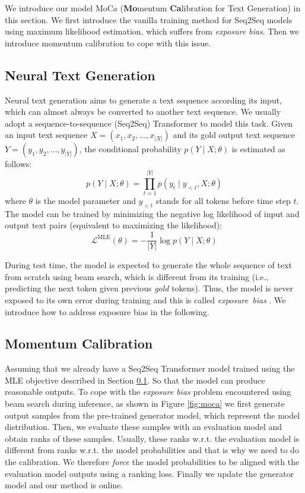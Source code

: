\documentclass{article}
\begin{document}
We introduce our model MoCa ({\bf Mo}mentum {\bf Ca}libration for Text Generation) in this section. We first introduce the vanilla training method for Seq2Seq models using maximum likelihood estimation, which suffers from \emph{exposure bias}. Then we introduce momentum calibration to cope with  this issue.

\subsection{Neural Text Generation}
\label{sec:generation}
Neural text generation aims to generate a text sequence according its input, which can almost always be converted to another text sequence. We usually adopt a sequence-to-sequence (Seq2Seq) Transformer \cite{Vaswani:2017:NIPS} to model this task. Given an input text sequence $X=( x_1, x_2, \ldots, x_{|X|} )$ and its gold output text sequence $Y= (y_1, y_2, \ldots, y_{|Y|} )$, the conditional probability $p(Y \mid X ; \theta)$ is estimated as follows:
\begin{equation}
    \label{eq:model_prob}
    p(Y \mid X ; \theta)=\prod_{t=1}^{|Y|} p\left(y_t \mid y_{<t}, X ; \theta\right)
\end{equation}
where $\theta$ is the model parameter and $y_{<t}$ stands for all tokens before time step $t$.
The model can be trained by minimizing the negative log likelihood of input and output text pairs (equivalent to maximizing the likelihood):
\begin{equation}
    \label{eq:nll_loss}
    \mathcal{L}^{\text{MLE}}(\theta)=-\frac{1}{|Y|} \log p(Y \mid X ; \theta)
\end{equation}

During test time, the model is expected to generate the whole sequence of text from scratch using beam search, which is different from its training (i.e., predicting the next token given previous \emph{gold} tokens). Thus, the model is never exposed to its own error during training and this is called 
\mbox{\emph{exposure bias}} \cite{ranzato:2015:arxiv}. We introduce how to address exposure bias in the following.


\subsection{Momentum Calibration}
Assuming that we already have a Seq2Seq Transformer model trained using the MLE objective described in Section \ref{sec:generation}. So that the model can produce reasonable outputs. To cope with the \emph{exposure bias} problem encountered using beam search during inference, as shown in Figure \ref{fig:moca} we first generate output samples from the pre-trained generator model, which represent the model distribution. Then, we evaluate these samples with an evaluation model and obtain ranks of these samples. Usually, these ranks w.r.t. the evaluation model is different from ranks w.r.t. the model probabilities and that is why we need to do the calibration. We therefore \emph{force} the model probabilities to be aligned with the evaluation model outputs using a ranking loss. Finally we update the generator model and our method is online. 
\end{document}
